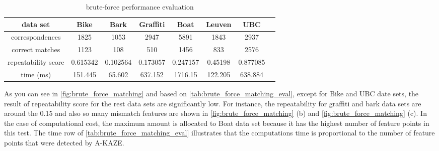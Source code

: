 \begin{table}[H]
  \begin{tabular}{| c || c | c | c | c | c | c | c |}
      \hline
      data set & Bike & Bark & Graffiti & Boat & Leuven & UBC \\ \hline \hline
      correspondences & 1825 & 1053 & 2947 & 5891 & 1843 & 2937 \\ \hline
      correct matches & 1123 & 108 & 510 & 1456 & 833 & 2576 \\ \hline
      repeatability score & 0.615342 & 0.102564 & 0.173057 & 0.247157 & 0.45198 & 0.877085\\ \hline
      time (ms) & 151.445 & 65.602 & 637.152 & 1716.15 & 122.205 & 638.884 \\ \hline
  \end{tabular}
  \caption{brute-force performance evaluation} \label{tab:brute_force_matching_eval}
\end{table}

As you can see in \autoref{fig:brute_force_matching} and based on \autoref{tab:brute_force_matching_eval}, except for Bike and UBC date sets, the result of repeatability score for the rest data sets are significantly low. For instance, the repeatability for graffiti and bark data sets are around the 0.15 and also so many mismatch features are shown in \autoref{fig:brute_force_matching} (b) and \autoref{fig:brute_force_matching} (c). In the case of computational cost, the maximum amount is allocated to Boat data set because it has the highest number of feature points in this test. The time row of \autoref{tab:brute_force_matching_eval} illustrates that the computations time is proportional to the number of feature points that were detected by A-KAZE.

